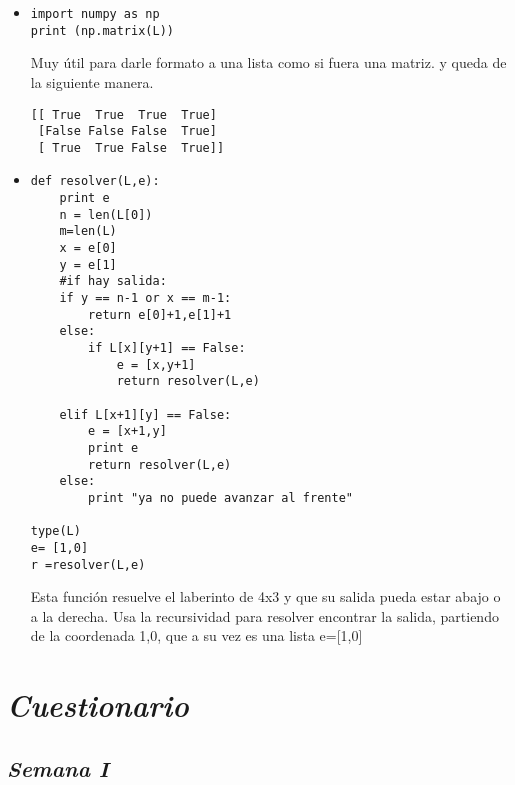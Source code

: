 \documentclass{book}
\begin{document}
\begin{itemize}
		
		\item \begin{lstlisting}
import numpy as np
print (np.matrix(L)) 
		\end{lstlisting}  Muy útil para darle formato a una lista como si fuera una matriz. y queda de la siguiente manera.\\
		\begin{lstlisting}
[[ True  True  True  True]
 [False False False  True]
 [ True  True False  True]]
		\end{lstlisting}
		
		
		
		\item \begin{lstlisting}
def resolver(L,e):
    print e
    n = len(L[0])
    m=len(L)
    x = e[0]
    y = e[1]
    #if hay salida:
    if y == n-1 or x == m-1:
        return e[0]+1,e[1]+1 
    else:
        if L[x][y+1] == False:
            e = [x,y+1]
            return resolver(L,e)
		
    elif L[x+1][y] == False:
        e = [x+1,y]
        print e
        return resolver(L,e)
    else:
        print "ya no puede avanzar al frente"
		
type(L)                      
e= [1,0]        
r =resolver(L,e)
		\end{lstlisting} Esta función resuelve el laberinto de 4x3 y que su salida pueda estar abajo o a la derecha. Usa la recursividad para resolver encontrar la salida, partiendo de la coordenada 1,0, que a su vez es una
		lista e=[1,0]
		
		
		
	\end{itemize}
	
	
	
	
	
	
	


\chapter{\textit{Cuestionario}}
\section{\textit{Semana I}}%
\end{document}
